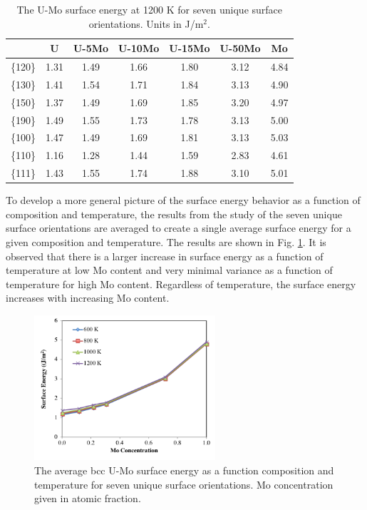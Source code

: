 \documentclass[review]{elsarticle}
\providecommand{\DIFaddbeginFL}{} %
\providecommand{\DIFaddendFL}{} %
\providecommand{\DIFdelbeginFL}{} %
\providecommand{\DIFdelendFL}{} %
\newcommand{\DIFscaledelfig}{0.5}
\newlength{\DIFdelgraphicswidth} %
\newlength{\DIFdelgraphicsheight} %
\newcommand{\DIFaddincludegraphics}[2][]{{\color{blue}\fbox{\DIFOincludegraphics[#1]{#2}}}} %
\newcommand{\DIFdelincludegraphics}[2][]{%
\sbox{\DIFdelgraphicsbox}{\DIFOincludegraphics[#1]{#2}}%
\settoboxwidth{\DIFdelgraphicswidth}{\DIFdelgraphicsbox} %
\settoboxtotalheight{\DIFdelgraphicsheight}{\DIFdelgraphicsbox} %
\scalebox{\DIFscaledelfig}{%
\parbox[b]{\DIFdelgraphicswidth}{\usebox{\DIFdelgraphicsbox}\\[-\baselineskip] \rule{\DIFdelgraphicswidth}{0em}}\llap{\resizebox{\DIFdelgraphicswidth}{\DIFdelgraphicsheight}{%
\setlength{\unitlength}{\DIFdelgraphicswidth}%
\begin{picture}(1,1)%
\thicklines\linethickness{2pt} %
{\color[rgb]{1,0,0}\put(0,0){\framebox(1,1){}}}%
{\color[rgb]{1,0,0}\put(0,0){\line( 1,1){1}}}%
{\color[rgb]{1,0,0}\put(0,1){\line(1,-1){1}}}%
\end{picture}%
}\hspace*{3pt}}} %
} %
\DeclareRobustCommand{\DIFaddbeginFL}{\DIFOaddbeginFL \let\includegraphics\DIFaddincludegraphics} %
\DeclareRobustCommand{\DIFaddendFL}{\DIFOaddendFL \let\includegraphics\DIFOincludegraphics} %
\DeclareRobustCommand{\DIFdelbeginFL}{\DIFOdelbeginFL \let\includegraphics\DIFdelincludegraphics} %
\DeclareRobustCommand{\DIFdelendFL}{\DIFOaddendFL \let\includegraphics\DIFOincludegraphics} %
\begin{document}
\begin{table}[h]
\caption{The U-Mo surface energy at 1200 K for seven unique surface orientations. Units in J/m$^{2}$.} \label{tab:umosurf1200}
\begin{center}
\begin{tabular}{|c|c|c|c|c|c|c|}
	\hline
 & U & U-5Mo & U-10Mo & U-15Mo & U-50Mo & Mo \\
\hline
\{120\} & 1.31 & 1.49 & 1.66 & 1.80 & 3.12 & 4.84 \\
\{130\}	 & 1.41 & 1.54 & 1.71 & 1.84 & 3.13 & 4.90 \\ 
\{150\}	 & 1.37 & 1.49 & 1.69 & 1.85 & 3.20 & 4.97 \\
\{190\}	 & 1.49 & 1.55 & 1.73 & 1.78 & 3.13 & 5.00 \\
\{100\}	 & 1.47 & 1.49 & 1.69 & 1.81 & 3.13 & 5.03 \\
\{110\}	 & 1.16 & 1.28 & 1.44 & 1.59 & 2.83 & 4.61 \\
\{111\}	 & 1.43 & 1.55 & 1.74 & 1.88 & 3.10 & 5.01 \\
 	 \hline
\end{tabular}
\end{center}
\label{default}
\end{table}

\FloatBarrier

To develop a more general picture of the surface energy behavior as a function of composition and temperature, the results from the study of the seven unique surface orientations are averaged to create a single average surface energy for a given composition and temperature. The results are shown in Fig. \ref{fig:avgvsmoS}. It is observed that there is a larger increase in surface energy as a function of temperature at low Mo content and very minimal variance as a function of temperature for high Mo content. Regardless of temperature, the surface energy increases with increasing Mo content. 

\begin{figure}[h]
 \centering
 \DIFdelbeginFL %
\DIFdelendFL \DIFaddbeginFL \includegraphics[width=0.6\textwidth]{umoavgsurfA.png} 
 \DIFaddendFL \caption{The average bcc U-Mo surface energy as a function composition and temperature for seven unique surface orientations. Mo concentration given in atomic fraction.}
 \label{fig:avgvsmoS}
\end{figure}
\end{document}
